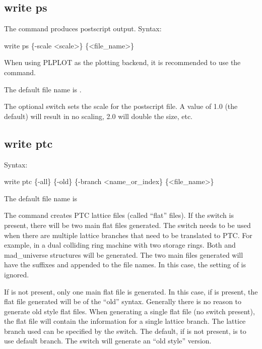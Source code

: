 {{{{{{{{{{{%

\subsection{write ps}
\label{s:write.ps}

The  command produces postscript output. Syntax:
\begin{example}
  write ps \{-scale <scale>\} \{<file_name>\}
\end{example}
When using PLPLOT as the plotting backend, it is recommended to use the  command.

The default file name is . 

The optional  switch sets the scale for the postscript file. A value of 1.0 (the
default) will result in no scaling, 2.0 will double the size, etc.


\subsection{write ptc}
\label{s:write.ptc}

Syntax:
\begin{example}
  write ptc \{-all\} \{-old\} \{-branch <name_or_index\} \{<file_name>\}
\end{example}

The default file name is 

The  command creates PTC lattice files (called ``flat'' files).  If the 
switch is present, there will be two main flat files generated. The  switch needs to be
used when there are multiple lattice branches that need to be translated to PTC. For example, in a
dual colliding ring machine with two storage rings. Both  and  mad_universe
structures will be generated. The two main files generated will have the suffixes  and
 appended to the file names. In this case, the setting of  is ignored.

If  is not present, only one main flat file is generated. In this case, if  is
present, the flat file generated will be of the ``old'' syntax. Generally there is no reason to
generate old style flat files. When generating a single flat file (no  switch present), the
flat file will contain the information for a single lattice branch. The lattice branch used can be
specified by the  switch. The default, if  is not present, is to use default
branch. The  switch will generate an ``old style'' version.

}}}}}}}}}}}
